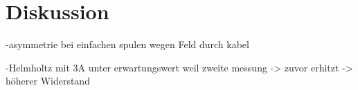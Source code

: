 \section{Diskussion}
\label{sec:Diskussion}


-asymmetrie bei einfachen spulen wegen Feld durch kabel

-Helmholtz mit 3A unter erwartungswert weil zweite messung -> zuvor erhitzt ->
höherer Widerstand

